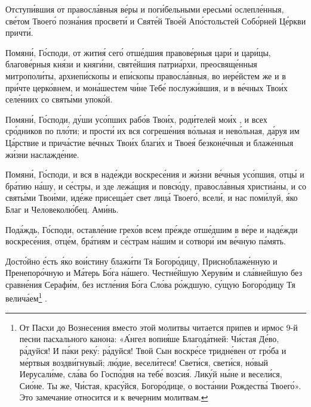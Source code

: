 \begin{mymulticols}
Отступ\'{и}вшия от правосл\'{а}вныя в\'{е}ры и пог\'{и}бельными ересьм\'{и} ослепл\'{е}нныя, св\'{е}том Твоег\'{о} позн\'{а}ния просвет\'{и} и Свят\'{е}й Тво\'{е}й Ап\'{о}стольстей Соб\'{о}рней Ц\'{е}ркви причт\'{и}.  


Помян\'{и}, Г\'{о}споди, от жити\'{я} сег\'{о} отш\'{е}дшия правов\'{е}рныя цар\'{и} и цар\'{и}цы, благов\'{е}рныя кн\'{я}зи и княг\'{и}ни, свят\'{е}йшия патри\'{а}рхи, преосвящ\'{е}нныя митропол\'{и}ты, архиеп\'{и}скопы и еп\'{и}скопы правосл\'{а}вныя, во иер\'{е}йстем же и в пр\'{и}чте церк\'{о}внем, и мон\'{а}шестем ч\'{и}не Теб\'{е} послуж\'{и}вшия, и в в\'{е}чных Тво\'{и}х сел\'{е}ниих со свят\'{ы}ми упок\'{о}й. 

Помян\'{и}, Г\'{о}споди, д\'{у}ши ус\'{о}пших раб\'{о}в Тво\'{и}х, род\'{и}телей мо\'{и}х , и всех ср\'{о}дников по пл\'{о}ти; и прост\'{и} их вся согреш\'{е}ния в\'{о}льная и нев\'{о}льная, д\'{а}руя им Ц\'{а}рствие и прич\'{а}стие в\'{е}чных Тво\'{и}х благ\'{и}х и Твое\'{я} безкон\'{е}чныя и блаж\'{е}нныя ж\'{и}зни наслажд\'{е}ние.  

Помян\'{и}, Г\'{о}споди, и вся в над\'{е}жди воскрес\'{е}ния и ж\'{и}зни в\'{е}чныя ус\'{о}пшия, отц\'{ы} и бр\'{а}тию н\'{а}шу, и с\'{е}стры, и зде леж\'{а}щия и повс\'{ю}ду, правосл\'{а}вныя христи\'{а}ны, и со свят\'{ы}ми Тво\'{и}ми, ид\'{е}же присещ\'{а}ет свет лиц\'{а} Твоег\'{о}, всел\'{и}, и нас пом\'{и}луй, \'{я}ко Благ и Человекол\'{ю}бец. Ам\'{и}нь.  

Под\'{а}ждь, Г\'{о}споди, оставл\'{е}ние грех\'{о}в всем пр\'{е}жде отш\'{е}дшим в в\'{е}ре и над\'{е}жди воскрес\'{е}ния, отц\'{е}м, бр\'{а}тиям и с\'{е}страм н\'{а}шим и сотвор\'{и} им в\'{е}чную п\'{а}мять. 


Дост\'{о}йно \'{е}сть \'{я}ко во\'{и}стину блаж\'{и}ти Тя Богор\'{о}дицу, Присноблаж\'{е}нную и Пренепор\'{о}чную и М\'{а}терь Б\'{о}га н\'{а}шего. Честн\'{е}йшую Херув\'{и}м и сл\'{а}внейшую без сравн\'{е}ния Сераф\'{и}м, без истл\'{е}ния Б\'{о}га Сл\'{о}ва р\'{о}ждшую, с\'{у}щую Богор\'{о}дицу Тя велич\'{а}ем\footnote{От Пасхи до Вознесения вместо этой молитвы читается припев и ирмос 9-й песни пасхального канона: «\'{А}нгел вопи\'{я}ше Благод\'{а}тней: Ч\'{и}стая Д\'{е}во, р\'{а}дуйся! И п\'{а}ки рек\'{у}: р\'{а}дуйся! Твой Сын воскр\'{е}се тридн\'{е}вен от гр\'{о}ба и м\'{е}ртвыя воздв\'{и}гнувый; л\'{ю}дие, весел\'{и}теся! Свет\'{и}ся, свет\'{и}ся, н\'{о}вый Иерусал\'{и}ме, сл\'{а}ва бо Госп\'{о}дня на теб\'{е} возси\'{я}. Лик\'{у}й н\'{ы}не и весел\'{и}ся, Си\'{о}не. Ты же, Ч\'{и}стая, крас\'{у}йся, Богор\'{о}дице, о вост\'{а}нии Рождеств\'{а} Твоег\'{о}». Это замечание относится и к вечерним молитвам.} .


\end{mymulticols}
